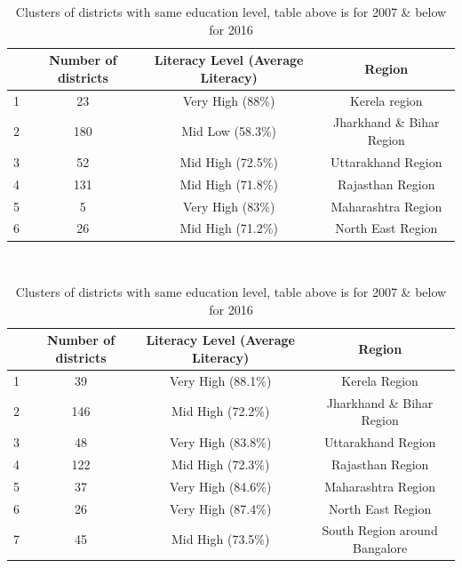 \documentclass[twoside]{article}
\begin{document}
\begin{table}[h]
    \centering
    \begin{tabular}{||cccc||}
    \hline
         & Number of districts & Literacy Level (Average Literacy)  & Region \\\hline
    1 & 23 & Very High (88\%) & Kerela region\\
    2 & 180& Mid Low (58.3\%) & Jharkhand \& Bihar Region\\ 
    3 & 52 & Mid High (72.5\%) & Uttarakhand Region\\ 
    4 & 131 & Mid High (71.8\%) & Rajasthan Region\\ 
    5 & 5 & Very High (83\%)& Maharashtra Region\\ 
    6 & 26& Mid High (71.2\%)& North East Region\\ \hline
    \end{tabular}
\\ [4mm]
    \begin{tabular}{||cccc||}
    \hline
         & Number of districts & Literacy Level (Average Literacy) & Region \\\hline
    1 & 39 & Very High (88.1\%)& Kerela Region\\
    2 & 146 & Mid High (72.2\%)& Jharkhand \& Bihar Region\\ 
    3 & 48 & Very High (83.8\%)& Uttarakhand Region\\ 
    4 & 122 & Mid High (72.3\%)& Rajasthan Region\\ 
    5 & 37 & Very High (84.6\%)& Maharashtra Region\\ 
    6 & 26 & Very High (87.4\%)& North East Region\\ 
    7 & 45 & Mid High (73.5\%)& South Region around Bangalore\\ \hline
    \end{tabular}
    \caption{Clusters of districts with same education level, table above is for 2007 \& below for 2016}
    \label{tab:literacy_cluster}
\end{table}
\end{document}

